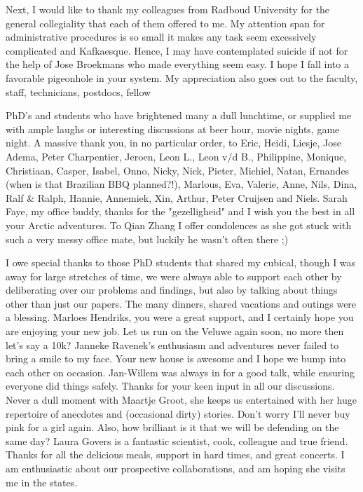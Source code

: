 \documentclass[b5paper,justified]{tufte-book} %
\begin{document}
Next, I would like to thank my colleagues from Radboud University for the general collegiality that each of them offered to me.  My attention span for administrative procedures is so small it makes any task seem excessively complicated and Kafkaesque. Hence, I may have contemplated suicide if not for the help of Jose Broekmans who made everything seem easy. I hope I fall into a favorable pigeonhole in your system.  My appreciation also goes out to the faculty, staff, technicians, postdocs, fellow \begin{fullwidth} PhD's and students who have brightened many a dull lunchtime, or supplied me with ample laughs or interesting discussions at beer hour, movie nights, game night. A massive thank you, in no particular order, to Eric, Heidi, Liesje, Jose Adema, Peter Charpentier, Jeroen, Leon L., Leon v/d B., Philippine, Monique, Christiaan, Casper, Isabel, Onno, Nicky, Nick, Pieter, Michiel, Natan, Ernandes (when is that Brazilian BBQ planned?!), Marlous, Eva, Valerie, Anne, Nils, Dina, Ralf \& Ralph, Hannie, Annemiek, Xin, Arthur, Peter Cruijsen and Niels. Sarah Faye, my office buddy, thanks for the "gezelligheid" and I wish you the best in all your Arctic adventures.  To Qian Zhang I offer condolences as she got stuck with such a very messy office mate, but luckily he wasn't often there ;) 

I owe special thanks to those PhD students that shared my cubical, though I was away for large stretches of time, we were always able to support each other by deliberating over our problems and findings, but also by talking about things other than just our papers. The many dinners, shared vacations and outings were a blessing. Marloes Hendriks, you were a great support, and I certainly hope you are enjoying your new job. Let us run on the Veluwe again soon, no more then let's say a 10k? Janneke Ravenek's enthusiasm and adventures never failed to bring a smile to my face. Your new house is awesome and I hope we bump into each other on occasion.  Jan-Willem was always in for a good talk, while ensuring everyone did things safely. Thanks for your keen input in all our discussions. Never a dull moment with Maartje Groot, she keeps us entertained with her huge repertoire of anecdotes and (occasional dirty) stories. Don't worry I'll never buy pink for a girl again. Also, how brilliant is it that we will be defending on the same day? Laura Govers is a fantastic scientist, cook, colleague and true friend. Thanks for all the delicious meals, support in hard times, and great concerts. I am enthusiastic about our prospective collaborations, and am hoping she visits me in the states. 


\end{fullwidth}
\end{document}
